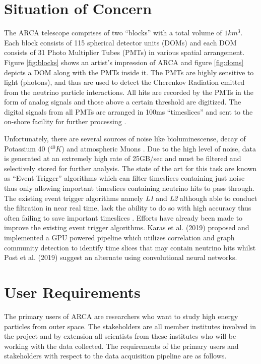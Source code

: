 \section{Situation of Concern}
\label{sec:soc}

The ARCA telescope comprises of two ``blocks'' with a total volume of
$1km^{3}$. Each block consists of 115 spherical detector units (DOMs)
and each DOM consists of 31 Photo Multiplier Tubes (PMTs) in various
spatial arrangement. Figure \ref{fig:blocks} shows an artist's
impression of ARCA and figure \ref{fig:doms} depicts a DOM along with
the PMTs inside it. The PMTs are highly sensitive to light (photons),
and thus are used to detect the Cherenkov Radiation emitted from the
neutrino particle interactions. All hits are recorded by the PMTs in
the form of analog signals and those above a certain threshold are
digitized. The digital signals from all PMTs are arranged in 100ms
``timeslices'' and sent to the on-shore facility for further
processing \cite{aiello2019km3net}.

Unfortunately, there are several sources of noise like
bioluminescense, decay of Potassium 40 ($^{40}K$) and atmospheric
Muons \cite{post2019km3nnet}. Due to the high level of noise, data is
generated at an extremely high rate of 25GB/sec
\cite{adrian2016letter} and must be filtered and selectively stored
for further analysis. The state of the art for this task are known as
``Event Trigger'' algorithms \cite{adrian2016letter,aiello2019km3net}
which can filter timeslices containing just noise thus only allowing
important timeslices containing neutrino hits to pass through. The
existing event trigger algorithms namely \emph{L1} and \emph{L2}
although able to conduct the filtration in near real time, lack the
ability to do so with high accuracy thus often failing to save
important timeslices \cite{karas2019data}. Efforts have already been
made to improve the existing event trigger algorithms. Karas et al.
(2019) proposed and implemented a GPU powered pipeline which utilizes
correlation and graph community detection to identify time slices that
may contain neutrino hits whilst Post et al. (2019) suggest an
alternate using convolutional neural networks.

\section{User Requirements}
\label{sec:user-req}

The primary users of ARCA are researchers who want to study high
energy particles from outer space. The stakeholders are all member
institutes involved in the project and by extension all scientists
from these institutes who will be working with the data collected. The
requirements of the primary users and stakeholders with respect to the
data acquisition pipeline are as follows.

